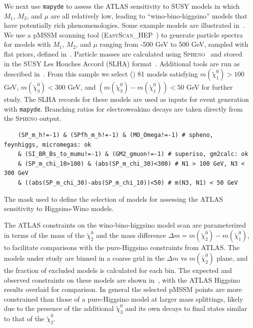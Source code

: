 \documentclass{article}
\newcommand{\chioz}{\ensuremath{\widetilde{\chi}_{1}^{0}}}
\newcommand{\chitz}{\ensuremath{\widetilde{\chi}_{2}^{0}}}
\newcommand{\chithz}{\ensuremath{\widetilde{\chi}_{3}^{0}}}
\newcommand{\mapyde}{\texttt{mapyde}}
\newcommand{\easyscanhep}{\textsc{EasyScan\_HEP}}
\newcommand{\spheno}{\textsc{Spheno}}
\begin{document}
We next use \mapyde{} to assess the ATLAS sensitivity to SUSY models in which $M_1$, $M_2$, and $\mu$ are all relatively low, leading to \enquote{wino-bino-higgsino} models that have potentially rich phenomenologies. Some example models are illustrated in~. We use a pMSSM scanning tool (\easyscanhep~\cite{Shang:2023gfy,Han:2016gvr}) to generate particle spectra for models with $M_1$, $M_2$, and $\mu$ ranging from -500 GeV to 500 GeV, sampled with flat priors, defined in~.  Particle masses are calculated using \spheno~\cite{Porod:2003um,Porod:2011nf} and stored in the SUSY Les Houches Accord (SLHA) format~\cite{Allanach:2008qq}.  Additional tools are run as described in~.  From this sample we select () 81 models satisfying $m(\chioz) > 100$ GeV, $m(\chithz)<300$ GeV, and $(m(\chithz)-m(\chioz))<50$ GeV for further study.  The SLHA records for these models are used as inputs for event generation with \mapyde.  Branching ratios for electroweakino decays are taken directly from the \spheno{} output.

\begin{listing}[H]
	\begin{verbatim}
    (SP_m_h!=-1) & (SPfh_m_h!=-1) & (MO_Omega!=-1) # spheno, feynhiggs, micromegas: ok
    & (SI_BR_Bs_to_mumu!=-1) & (GM2_gmuon!=-1) # superiso, gm2calc: ok
    & (SP_m_chi_10>100) & (abs(SP_m_chi_30)<300) # N1 > 100 GeV, N3 < 300 GeV
    & ((abs(SP_m_chi_30)-abs(SP_m_chi_10))<50) # m(N3, N1) < 50 GeV
  \end{verbatim}
	\caption{The mask used to define the selection of models for assessing the ATLAS sensitivity to Higgsino-Wino models.}
	\label{lst:mask}
\end{listing}


The ATLAS constraints on the wino-bino-higgsino model scan are parameterized in terms of the mass of the \chitz{} and the mass difference $\Delta m=m(\chitz)-m(\chioz)$, to facilitate comparisons with the pure-Higgsino constraints from ATLAS.  The models under study are binned in a coarse grid in the $\Delta m$ vs $m(\chitz)$ plane, and the fraction of excluded models is calculated for each bin.  The expected and observed constraints on these models are shown in~, with the ATLAS Higgsino results overlaid for comparison.  In general the selected pMSSM points are more constrained than those of a pure-Higgsino model at larger mass splittings, likely due to the presence of the additional \chithz{} and its own decays to final states similar to that of the \chitz.
\end{document}
